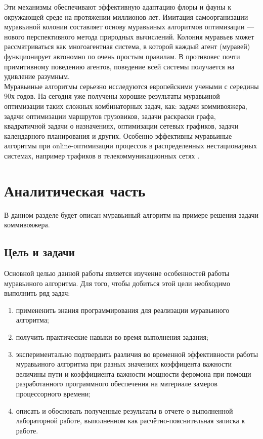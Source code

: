 \documentclass[12pt, a4paper]{report}
\begin{document}
	Эти механизмы обеспечивают эффективную адаптацию флоры и фауны к окружающей среде на протяжении миллионов лет. Имитация самоорганизации муравьиной колонии составляет основу муравьиных алгоритмов оптимизации — нового перспективного метода природных вычислений. Колония муравьев может рассматриваться как многоагентная система, в которой каждый агент (муравей) функционирует автономно по очень простым правилам. В противовес почти примитивному поведению агентов, поведение всей системы получается на удивление разумным.\\
	
	Муравьиные алгоритмы серьезно исследуются европейскими учеными с середины 90х годов. На сегодня уже получены хорошие результаты муравьиной оптимизации таких сложных комбинаторных задач, как: задачи коммивояжера, задачи оптимизации маршрутов грузовиков, задачи раскраски графа, квадратичной задачи о назначениях, оптимизации сетевых графиков, задачи календарного планирования и других. Особенно эффективны муравьиные алгоритмы при online-оптимизации процессов в распределенных нестационарных системах, например трафиков в телекоммуникационных сетях \cite{shtovba}.
	\newpage
	
	\chapter{Аналитическая часть}
	
	В данном разделе будет описан муравьиный алгоритм на примере решения задачи коммивояжера.
	
	\section{Цель и задачи}
	
	Основной целью данной работы является изучение особенностей работы муравьиного алгоритма.
	Для того, чтобы добиться этой цели необходимо выполнить ряд задач:\\
	\begin{enumerate}
		\item примененить знания программирования для реализации муравьиного алгоритма;
		\item получить практические навыки во время выполнения задания;
		\item экспериментально подтвердить различия во временной эффективности работы муравьиного алгоритма при разных значениях коэффицента важности величины пути и коэффициента важности мощности феромона при помощи разработанного программного обеспечения на материале замеров процессорного времени;
		\item описать и обосновать полученные результаты в отчете о выполненной лабораторной работе, выполненном как расчётно-пояснительная записка к работе.
	\end{enumerate}
\end{document}
